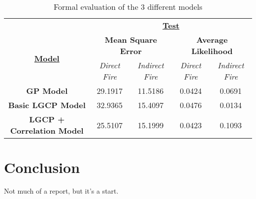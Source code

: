 \documentclass[a4paper,11pt]{report}
\begin{document}
\begin{table}[]
\centering
\caption{Formal evaluation of the 3 different models}
\label{model-comparison}
\begin{tabular}{ccccc}
\multicolumn{1}{l}{}                                       & \multicolumn{4}{c}{{\ul \textbf{Test}}}                                                                                                                                           \\
\multicolumn{1}{c|}{\multirow{2}{*}{{\ul \textbf{Model}}}} & \multicolumn{2}{c|}{\textbf{Mean Square Error}}                                         & \multicolumn{2}{c|}{\textbf{Average Likelihood}}                                                         \\
\multicolumn{1}{c|}{}                                      & \multicolumn{1}{c|}{\textit{Direct Fire}} & \multicolumn{1}{c|}{\textit{Indirect Fire}} & \multicolumn{1}{c|}{\textit{Direct Fire}} & \multicolumn{1}{c|}{\textit{Indirect Fire}} \\ \hline
\multicolumn{1}{|c|}{\textbf{GP Model}}                    & \multicolumn{1}{c|}{29.1917}              & \multicolumn{1}{c|}{11.5186}                & \multicolumn{1}{c|}{0.0424}               & \multicolumn{1}{c|}{0.0691}                 \\ \hline
\multicolumn{1}{|c|}{\textbf{Basic LGCP Model}}            & \multicolumn{1}{c|}{32.9365}              & \multicolumn{1}{c|}{15.4097}                & \multicolumn{1}{c|}{0.0476}               & \multicolumn{1}{c|}{0.0134}                 \\ \hline
\multicolumn{1}{|c|}{\textbf{LGCP + Correlation Model}}    & \multicolumn{1}{c|}{25.5107}              & \multicolumn{1}{c|}{15.1999}                & \multicolumn{1}{c|}{0.0423}               & \multicolumn{1}{c|}{0.1093}                 \\ \hline
\end{tabular}
\end{table}




\chapter{Conclusion}
Not much of a report, but it's a start.

\singlespacing 



\end{document}
